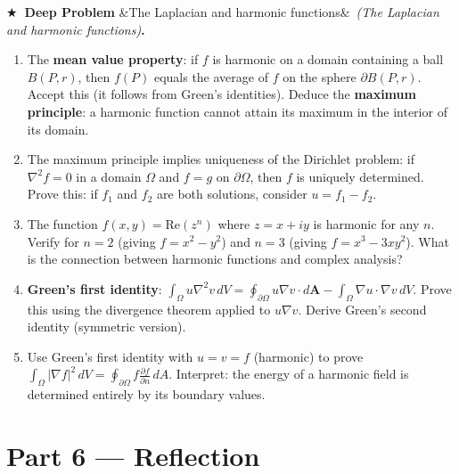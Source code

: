 \documentclass[12pt,a4paper]{article}
\newcounter{problem}
\newcounter{deepproblem}
\newenvironment{deepproblem}[1][]{\refstepcounter{deepproblem}\par\vspace{6pt}\noindent\textbf{\color{NavyBlue}$\bigstar$\ Deep Problem \thedeepproblem}\ifx&#1&\else\ \textit{(#1)}\fi\textbf{.}\enskip}{\par\vspace{4pt}}
\begin{document}
\begin{deepproblem}[The Laplacian and harmonic functions]
\begin{enumerate}[label=(\alph*)]
  \item The \textbf{mean value property}: if $f$ is harmonic on a domain containing a ball $B(P,r)$, then $f(P)$ equals the average of $f$ on the sphere $\partial B(P,r)$. Accept this (it follows from Green's identities). Deduce the \textbf{maximum principle}: a harmonic function cannot attain its maximum in the interior of its domain.
  \item The maximum principle implies uniqueness of the Dirichlet problem: if $\nabla^2 f=0$ in a domain $\Omega$ and $f=g$ on $\partial\Omega$, then $f$ is uniquely determined. Prove this: if $f_1$ and $f_2$ are both solutions, consider $u=f_1-f_2$.
  \item The function $f(x,y) = \text{Re}(z^n)$ where $z=x+iy$ is harmonic for any $n$. Verify for $n=2$ (giving $f=x^2-y^2$) and $n=3$ (giving $f=x^3-3xy^2$). What is the connection between harmonic functions and complex analysis?
  \item \textbf{Green's first identity}: $\int_\Omega u\nabla^2v\,dV = \oint_{\partial\Omega}u\nabla v\cdot d\mathbf{A} - \int_\Omega\nabla u\cdot\nabla v\,dV$. Prove this using the divergence theorem applied to $u\nabla v$. Derive Green's second identity (symmetric version).
  \item Use Green's first identity with $u=v=f$ (harmonic) to prove $\int_\Omega|\nabla f|^2\,dV = \oint_{\partial\Omega}f\frac{\partial f}{\partial n}\,dA$. Interpret: the energy of a harmonic field is determined entirely by its boundary values.
\end{enumerate}
\end{deepproblem}

\section{Part 6 \texorpdfstring{---}{--} Reflection}
\end{document}
